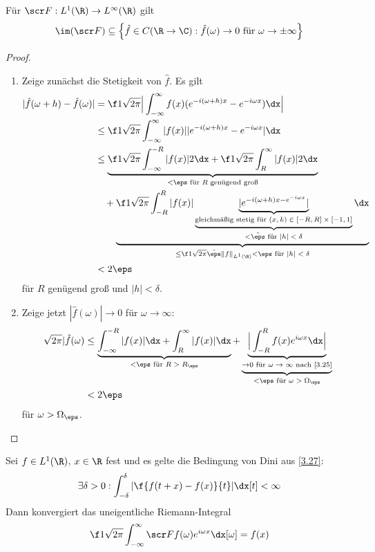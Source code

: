 \begin{st} \label{4.25}
	Für $\scr F: L^1(\R) \to L^\infty(\R)$ gilt
	\[
		\im (\scr F) \subset \Big\{ \hat f \in C(\R \to \C) : \hat f(\omega) \to 0 \text{ für } \omega \to \pm \infty \Big\}
	\]
	\begin{proof}
		\begin{enumerate}[1)]
			\item
				Zeige zunächst die Stetigkeit von $\hat f$.
				Es gilt
				\begin{align*}
					| \hat f(\omega + h) - \hat f(\omega) |
					&= \f 1{\sqrt{2\pi}} \Big| \int_{-\infty}^\infty f(x) ( e^{-i(\omega + h)x} - e^{-i \omega x} ) \dx \Big| \\
					&\le \f 1{\sqrt{2\pi}} \int_{-\infty}^\infty |f(x)| | e^{-i(\omega + h)x} - e^{-i \omega x} | \dx \\
					&\le \underbrace{\f 1{\sqrt{2\pi}} \int_{-\infty}^{-R} |f(x)| 2 \dx 
						+ \f 1{\sqrt{2\pi}} \int_{R}^{\infty} |f(x)| 2 \dx}_{< \eps \text{ für $R$ genügend groß}} \\
						&\quad + \underbrace{\f 1{\sqrt{2\pi}} \int_{-R}^{R} |f(x)| \underbrace{\underbrace{|e^{-i(\omega + h) x - e^{-i \omega x}}|}_{\text{gleichmäßig stetig für $(x,k) \in [-R,R] \times [-1,1]$}}}_{< \tilde \eps \text{ für $|h|<\delta$}} \dx}_{\le \f 1{\sqrt{2\pi}} \tilde \eps \|f\|_{L^1(\R)} < \eps \text{ für $|h|<\delta$}} \\
					&< 2\eps
				\end{align*}
				für $R$ genügend groß und $|h| < \delta$.
			\item
				Zeige jetzt $|\hat f(\omega)| \to 0$ für $\omega \to \infty$:
				\begin{align*}
					\sqrt{2\pi} |\hat f(\omega) 
					&\le  \underbrace{\int_{-\infty}^{-R} |f(x)| \dx + \int_{R}^{\infty} |f(x)| \dx}_{<\eps \text{ für $R > R_\eps$}}
					+ \underbrace{\underbrace{\Big| \int_{-R}^R f(x) e^{i\omega x} \dx \Big|}_{\to 0 \text{ für $\omega \to \infty$ nach \ref{3.25}}}}_{<\eps \text{ für $\omega > \Omega_\eps$}} \\
					&< 2\eps
				\end{align*}
				für $\omega > \Omega_\eps$.
		\end{enumerate}
	\end{proof}
\end{st}

\begin{st} \label{4.26}
	Sei $f \in L^1(\R)$, $x \in \R$ fest und es gelte die Bedingung von Dini aus \ref{3.27}:
	\[
		\exists \delta > 0 : \int_{-\delta}^{\delta} | \f {f(t+x)-f(x)}{t} | \dx[t] < \infty
	\]
	Dann konvergiert das uneigentliche Riemann-Integral
	\[
		\f 1{\sqrt{2\pi}} \int_{-\infty}^\infty \scr F f(\omega) e^{i \omega x} \dx[\omega] = f(x)
	\]
\end{st}


